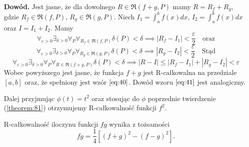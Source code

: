 \documentclass[leqno]{article}
\newcommand{\proof}{\noindent\textbf{Dowód. }}
\begin{document}
\begin{justify}
\proof{} Jest jasne, że dla dowolnego $R \in \mathfrak{R}(f+g, P)$ mamy $R = R_f + R_g$, gdzie $R_f \in \mathfrak{R}(f, P)$, $R_g \in \mathfrak{R}(g, P)$.
Niech $I_1 = \int_{a}^{b}f(x)dx$, $I_2 = \int_{a}^{b}f(x)dx$ oraz $I = I_1 + I_2$. Mamy
\[
    \forall_{\varepsilon > 0} \exists_{\delta > 0} \forall_P \forall_{R_f \in \mathfrak{R}(f, P)} \delta(P) < \delta \implies |R_f - I_1| < \frac{\varepsilon}{2} \quad \text{oraz}
\]
\[
    \forall_{\varepsilon > 0} \exists_{\delta > 0} \forall_P \forall_{R_g \in \mathfrak{R}(g, P)} \delta(P) < \delta \implies |R_g - I_2| < \frac{\varepsilon}{2} \quad \text{Stąd}
\]
\[
    \forall_{\varepsilon > 0} \exists_{\delta > 0} \forall_P \forall_{R \in \mathfrak{R}(f+g, P)} \delta(P) < \delta \implies |R - I| \leqslant |R_f - I_1| + |R_g - I_2| < \varepsilon
\]
Wobec powyższego jest jasne, że funkcja $f + g$ jest R-całkowalna na przedziale $[a,b]$ oraz, że spełniony jest wzór $\ref{eq:40}$.
Dowód wzoru $\ref{eq:41}$ jest analogiczny.

\noindent
Dalej przyjmując $\phi(t) = t^2$ oraz stosując do $\phi$ poprzednie twierdzenie (\ref{theorem:81}) otrzymujemy
R-całkowalność funkcji $f^2$.

\noindent
R-całkowalność iloczynu funkcji $fg$ wynika z tożsamości
\[
    fg = \frac{1}{4}[{(f+g)}^2 - {(f-g)}^2].
\]


\end{justify}
\end{document}
